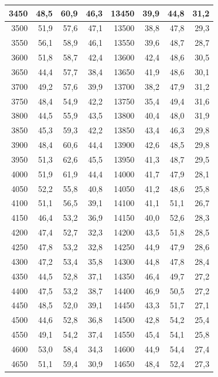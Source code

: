\begin{small}
\begin{longtable}{|r|r|r|r|r|r|r|r|}
3450 & 48,5 & 60,9 & 46,3 & 13450 & 39,9 & 44,8 & 31,2 \\ \hline
3500 & 51,9 & 57,6 & 47,1 & 13500 & 38,8 & 47,8 & 29,3 \\ \hline
3550 & 56,1 & 58,9 & 46,1 & 13550 & 39,6 & 48,7 & 28,7 \\ \hline
3600 & 51,8 & 58,7 & 42,4 & 13600 & 42,4 & 48,6 & 30,5 \\ \hline
3650 & 44,4 & 57,7 & 38,4 & 13650 & 41,9 & 48,6 & 30,1 \\ \hline
3700 & 49,2 & 57,6 & 39,9 & 13700 & 38,2 & 47,9 & 31,2 \\ \hline
3750 & 48,4 & 54,9 & 42,2 & 13750 & 35,4 & 49,4 & 31,6 \\ \hline
3800 & 44,5 & 55,9 & 43,5 & 13800 & 40,4 & 48,0 & 31,9 \\ \hline
3850 & 45,3 & 59,3 & 42,2 & 13850 & 43,4 & 46,3 & 29,8 \\ \hline
3900 & 48,4 & 60,6 & 44,4 & 13900 & 42,6 & 48,5 & 29,8 \\ \hline
3950 & 51,3 & 62,6 & 45,5 & 13950 & 41,3 & 48,7 & 29,5 \\ \hline
4000 & 51,9 & 61,9 & 44,4 & 14000 & 41,7 & 47,9 & 28,1 \\ \hline
4050 & 52,2 & 55,8 & 40,8 & 14050 & 41,2 & 48,6 & 25,8 \\ \hline
4100 & 51,1 & 56,5 & 39,1 & 14100 & 41,1 & 51,1 & 26,7 \\ \hline
4150 & 46,4 & 53,2 & 36,9 & 14150 & 40,0 & 52,6 & 28,3 \\ \hline
4200 & 47,4 & 52,7 & 32,3 & 14200 & 43,5 & 51,8 & 28,5 \\ \hline
4250 & 47,8 & 53,2 & 32,8 & 14250 & 44,9 & 47,9 & 28,6 \\ \hline
4300 & 47,2 & 53,4 & 35,8 & 14300 & 44,8 & 47,8 & 28,4 \\ \hline
4350 & 44,5 & 52,8 & 37,1 & 14350 & 46,4 & 49,7 & 27,2 \\ \hline
4400 & 47,5 & 53,2 & 38,7 & 14400 & 46,9 & 50,5 & 27,2 \\ \hline
4450 & 48,5 & 52,0 & 39,1 & 14450 & 43,3 & 51,7 & 27,1 \\ \hline
4500 & 44,6 & 52,8 & 36,8 & 14500 & 42,8 & 54,2 & 25,4 \\ \hline
4550 & 49,1 & 54,2 & 37,4 & 14550 & 45,4 & 54,1 & 25,8 \\ \hline
4600 & 53,0 & 58,4 & 34,3 & 14600 & 44,9 & 54,4 & 27,4 \\ \hline
4650 & 51,1 & 59,4 & 30,9 & 14650 & 48,4 & 52,4 & 27,3 \\ \hline

\end{longtable}
\end{small}
